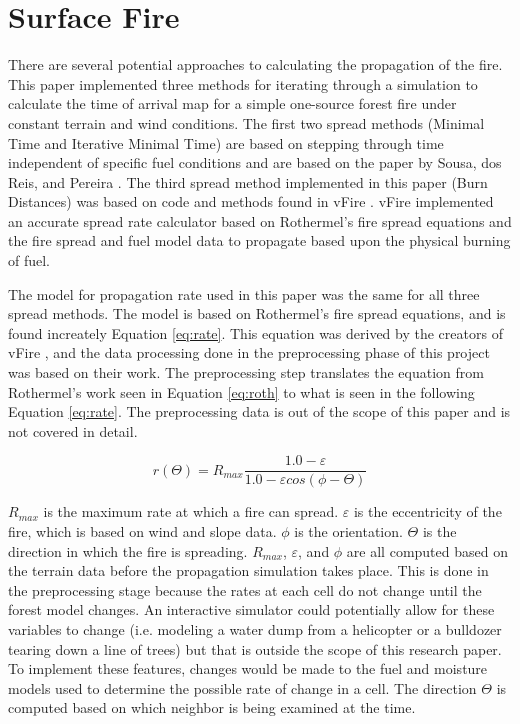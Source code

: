 \section{Surface Fire}
There are several potential approaches to calculating the propagation of the fire. This paper implemented three methods for iterating through a simulation to calculate the time of arrival map for a simple one-source forest fire under constant terrain and wind conditions. The first two spread methods (Minimal Time and Iterative Minimal Time) are based on stepping through time independent of specific fuel conditions and are based on the paper by Sousa, dos Reis, and Pereira \cite{gpufire}. The third spread method implemented in this paper (Burn Distances) was based on code and methods found in vFire \cite{vFire}. vFire implemented an accurate spread rate calculator based on Rothermel's fire spread equations and the fire spread and fuel model data to propagate based upon the physical burning of fuel.

The model for propagation rate used in this paper was the same for all three spread methods. The model is based on Rothermel's fire spread equations, and is found increately Equation \ref{eq:rate}. This equation was derived by the creators of vFire \cite{vFire}, and the data processing done in the preprocessing phase of this project was based on their work. The preprocessing step translates the equation from Rothermel's work seen in Equation \ref{eq:roth} to what is seen in the following Equation \ref{eq:rate}. The preprocessing data is out of the scope of this paper and is not covered in detail. 

\begin{equation}
r(\Theta ) = R_{max}\frac{1.0 - \varepsilon }{1.0 - \varepsilon cos(\phi-\Theta )}
\label{eq:rate}
\end{equation}

$R_{max}$ is the maximum rate at which a fire can spread. $\varepsilon$ is the eccentricity of the fire, which is based on wind and slope data. $\phi$ is the orientation. $\Theta$ is the direction in which the fire is spreading. $R_{max}$, $\varepsilon$, and $\phi$ are all computed based on the terrain data before the propagation simulation takes place. This is done in the preprocessing stage because the rates at each cell do not change until the forest model changes. An interactive simulator could potentially allow for these variables to change (i.e. modeling a water dump from a helicopter or a bulldozer tearing down a line of trees) but that is outside the scope of this research paper. To implement these features, changes would be made to the fuel and moisture models used to determine the possible rate of change in a cell. The direction $\Theta$ is computed based on which neighbor is being examined at the time. 

